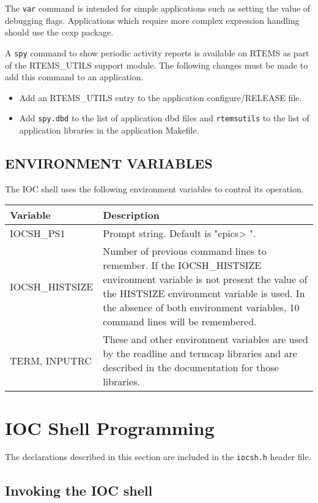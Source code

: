 The \verb|var| command is intended for simple applications such as setting the value of debugging flags.  Applications which 
require more complex expression handling should use the cexp package.

A \verb|spy| command to show periodic activity reports is available on RTEMS as part of the RTEMS\_UTILS support module.  
The following changes must be made to add this command to an application.

\begin{itemize}\item Add an RTEMS\_UTILS entry to the application configure/RELEASE file.

\item Add \verb|spy.dbd| to the list of application dbd files and \verb|rtemsutils| to the list of application libraries in the 
application Makefile.

\end{itemize}\subsection{ENVIRONMENT VARIABLES}

The IOC shell uses the following environment variables to control its operation.
\begin{center}\begin{longtable}{p{1.305in}p{5.46in}}
Variable & Description\\
\hline
IOCSH\_PS1 & Prompt string. Default is "epics\textgreater{} ".\\
IOCSH\_HISTSIZE & Number of previous command lines to remember. If the IOCSH\_HISTSIZE environment variable is not present the value of the HISTSIZE environment variable is used.  In the absence of both environment variables, 10 command lines will be remembered.\\
TERM, INPUTRC & These and other environment variables are used by the readline and termcap libraries and are described in the documentation for those libraries.
\end{longtable}\end{center}


\section{IOC Shell Programming}

The declarations described in this section are included in the \verb|iocsh.h| header file.

\subsection{Invoking the IOC shell}

